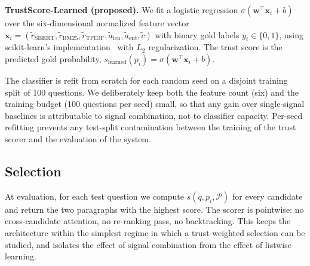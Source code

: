 \textbf{TrustScore-Learned (proposed).} We fit a logistic regression
$\sigma(\mathbf{w}^\top \mathbf{x}_i + b)$ over the six-dimensional
normalized feature vector
$\mathbf{x}_i = (\tilde r_{\text{SBERT}}, \tilde r_{\text{BM25}}, \tilde r_{\text{TFIDF}}, \tilde a_{\text{len}}, \tilde a_{\text{ent}}, \tilde c)$
with binary gold labels $y_i\in\{0,1\}$, using scikit-learn's implementation~\cite{pedregosa2011sklearn}
with $L_2$ regularization. The trust score is the predicted gold
probability,
$s_{\text{learned}}(p_i) = \sigma(\mathbf{w}^\top \mathbf{x}_i + b)$.

The classifier is refit from scratch for each random seed on a disjoint
training split of 100 questions. We deliberately keep both the feature
count (six) and the training budget (100 questions per seed) small, so
that any gain over single-signal baselines is attributable to signal
combination, not to classifier capacity. Per-seed refitting prevents
any test-split contamination between the training of the trust scorer
and the evaluation of the system.

\subsection{Selection}

At evaluation, for each test question we compute
$s(q, p_i, \mathcal{P})$ for every candidate and return the two
paragraphs with the highest score. The scorer is pointwise: no
cross-candidate attention, no re-ranking pass, no backtracking. This
keeps the architecture within the simplest regime in which a
trust-weighted selection can be studied, and isolates the effect of
signal combination from the effect of listwise learning.
